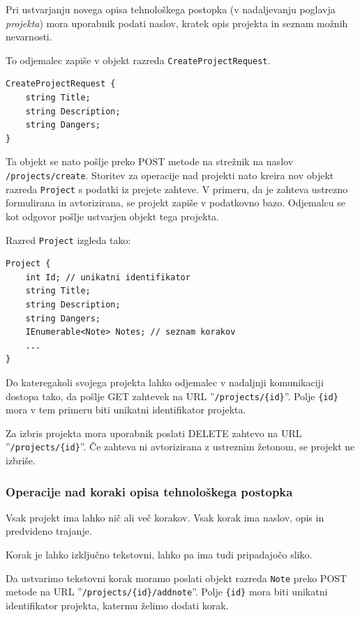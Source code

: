 \documentclass[a4paper, 12pt]{book}
\begin{document}
Pri ustvarjanju novega opisa tehnološkega postopka (v nadaljevanju poglavja \textit{projekta}) mora uporabnik podati naslov, kratek opis projekta in seznam možnih nevarnosti.

To odjemalec zapiše v objekt razreda \texttt{CreateProjectRequest}.

\begin{verbatim}
CreateProjectRequest { 
    string Title;  
    string Description; 
    string Dangers; 
} 
\end{verbatim}

\noindent Ta objekt se nato pošlje preko POST metode na strežnik na naslov \texttt{/projects/create}.
Storitev za operacije nad projekti nato kreira nov objekt razreda \texttt{Project} s podatki iz prejete zahteve.
V primeru, da je zahteva ustrezno formulirana in avtorizirana, se projekt zapiše v podatkovno bazo.
Odjemalcu se kot odgovor pošlje ustvarjen objekt tega projekta.

\noindent Razred \texttt{Project} izgleda tako:

\begin{verbatim}
Project { 
    int Id; // unikatni identifikator 
    string Title; 
    string Description; 
    string Dangers; 
    IEnumerable<Note> Notes; // seznam korakov 
    ... 
}
\end{verbatim}
Do kateregakoli svojega projekta lahko odjemalec v nadaljnji komunikaciji dostopa tako, da pošlje GET zahtevek na URL ''\texttt{/projects/\{id\}}''.
Polje \texttt{\{id\}} mora v tem primeru biti unikatni identifikator projekta.

Za izbris projekta mora uporabnik poslati DELETE zahtevo na URL ''\texttt{/projects/\{id\}}''.
Če zahteva ni avtorizirana z ustreznim žetonom, se projekt ne izbriše.

\subsubsection{Operacije nad koraki opisa tehnološkega postopka}

Vsak projekt ima lahko nič ali več korakov.
Vsak korak ima naslov, opis in predvideno trajanje.

Korak je lahko izključno tekstovni, lahko pa ima tudi pripadajočo sliko.

Da ustvarimo tekstovni korak moramo poslati objekt razreda \texttt{Note} preko POST metode na URL ''\texttt{/projects/\{id\}/addnote}''.
Polje \texttt{\{id\}} mora biti unikatni identifikator projekta, katermu želimo dodati korak.
\end{document}
